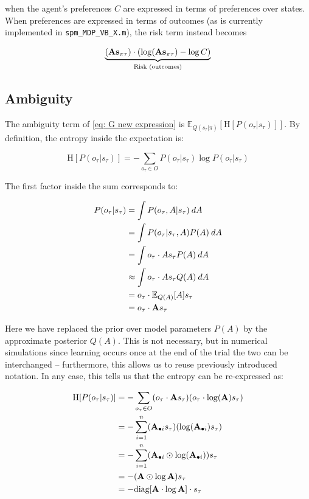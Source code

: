 \documentclass{article}
\begin{document}
    when the agent's preferences $C$ are expressed in terms of preferences over states. When preferences are expressed in terms of outcomes (as is currently implemented in \texttt{spm\_MDP\_VB\_X.m}), the risk term instead becomes
    
    \begin{equation}
    \label{eq: sol efe computation outcomes}
		\underbrace{(\bold A \bold s_{\pi\tau}) \cdot ( \log (\bold A \bold s_{\pi\tau}) - \log C)}_{\text{Risk (outcomes)}}
	\end{equation}
	
	\subsection{Ambiguity}
	
	The ambiguity term of \eqref{eq: G new expression} is $\mathbb E_{Q(s_\tau|\pi)} [\text{H}[P(o_\tau |s_\tau)]]$. By definition, the entropy inside the expectation is:
	
	\begin{equation}
	\text{H}[P(o_\tau |s_\tau )]=-\sum_{o_\tau \in O} P(o_\tau |s_\tau )\log P(o_\tau|s_\tau ) 
	\end{equation}
	
	The first factor inside the sum corresponds to:
	
	\begin{equation}
		\begin{split}
			P(o_\tau |s_\tau) &=\int P(o_\tau,A|s_\tau)\: dA \\
			&=\int P(o_\tau |s_\tau,A)P(A)\:dA \\
			&=\int o_\tau \cdot As_\tau P(A)\:dA \\
			&\approx \int o_\tau \cdot As_\tau Q(A) \: dA \\
			&= o_\tau \cdot \mathbb E_{ Q ( A )} [A] s_\tau  \\
			&=o_\tau \cdot \bold As_\tau 
		\end{split}
	\end{equation}

	Here we have replaced the prior over model parameters $P( A)$ by the approximate posterior $Q( A)$. This is not necessary, but in numerical simulations since learning occurs once at the end of the trial the two can be interchanged -- furthermore, this allows us to reuse previously introduced notation. In any case, this tells us that the entropy can be re-expressed as:
	
	\begin{equation}
		\begin{split}
			\text{H}[P(o_\tau |s_\tau )] &= - \sum_{o_\tau \in O} (o_\tau \cdot \bold As_\tau )(o_\tau \cdot \log (\bold A)s_\tau ) \\
		&= - \sum_{i=1}^n (\bold A_{\bullet i}s_\tau)(\log(\bold A_{\bullet i})s_\tau) \\
		&= - \sum_{i=1}^n (\bold A_{\bullet i}\odot \log (\bold A_{\bullet i}))s_\tau \\
		&= - (\bold A\odot \log \bold A)s_\tau\\
		&= - \text{diag} [\bold A \cdot \log \bold A ] \cdot s_\tau 
		\end{split}
	\end{equation}
	
\end{document}
